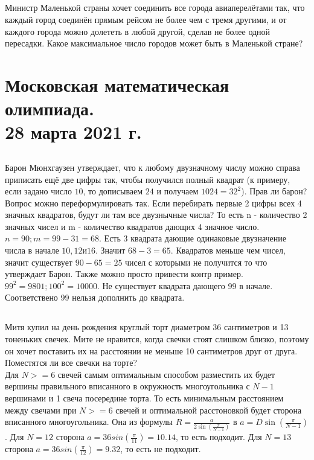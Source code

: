 \documentclass[a4paper,12pt]{article} %
\begin{document}
	\subsection{}{Министр Маленькой страны хочет соединить все города авиаперелётами так, что каждый город соединён прямым рейсом не более чем с тремя другими, и от каждого города можно долететь в любой другой, сделав не более одной пересадки. Какое максимальное число городов может быть в Маленькой стране?
		
	}
	
	\newpage
	\section{Московская математическая олимпиада. \\28 марта 2021 г.}
	
	\subsection{}{Барон Мюнхгаузен утверждает, что к любому двузначному числу можно справа приписать ещё две цифры так, чтобы получился полный квадрат (к примеру, если задано число $10$, то дописываем $24$ и получаем $1024 = 32^2$). Прав ли барон?\\
		
		Вопрос можно переформулировать так. Если перебирать первые 2 цифры всех 4 значных квадратов, будут ли там все двузнычные числа? То есть n - количество 2 значных чисел и m - количество квадратов дающих 4 значное число. $n = 90; m = 99-31 = 68$. Есть 3 квадрата дающие одинаковые двузначение числа в начале $10, 12 и 16$. Значит $68-3 = 65$. Квадратов меньше чем чисел, значит существует $90-65=25$ чисел с которыми не получится то что утверждает Барон. Также можно просто привести контр пример. $99^2 = 9801; 100^2 = 10000$. Не существует квадрата дающего 99 в начале. Соответствено 99 нельзя дополнить до квадрата.
	}
	
	\subsection{}{Митя купил на день рождения круглый торт диаметром 36 сантиметров и 13 тоненьких свечек. Мите не нравится, когда свечки стоят слишком близко, поэтому он хочет поставить их на расстоянии не меньше 10 сантиметров друг от друга. Поместятся ли все свечки на торте?\\
		
		Для $N>=6$ свечей самым оптимальным способом разместить их будет вершины правильного вписанного в окружность многоугольника с $N-1$ вершинами и 1 свеча посередине торта. То есть минимальным расстоянием между свечами при $N>=6$ свечей и оптимальной расстоновкой будет сторона вписанного многоугольника. Она из формулы $R = \frac{a}{2\sin(\frac{\pi}{N-1})}$ в  $a = D\sin(\frac{\pi}{N-1})$. Для $N = 12$ сторона $a = 36sin(\frac{\pi}{11}) = 10.14$, то есть подходит. Для $N = 13$ сторона $a = 36sin(\frac{\pi}{12}) = 9.32$, то есть не подходит.
	}
	
\end{document}
